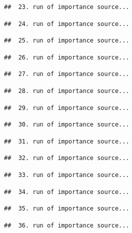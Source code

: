 \documentclass[
]{article}
\begin{document}
\begin{verbatim}
##  23. run of importance source...
\end{verbatim}

\begin{verbatim}
##  24. run of importance source...
\end{verbatim}

\begin{verbatim}
##  25. run of importance source...
\end{verbatim}

\begin{verbatim}
##  26. run of importance source...
\end{verbatim}

\begin{verbatim}
##  27. run of importance source...
\end{verbatim}

\begin{verbatim}
##  28. run of importance source...
\end{verbatim}

\begin{verbatim}
##  29. run of importance source...
\end{verbatim}

\begin{verbatim}
##  30. run of importance source...
\end{verbatim}

\begin{verbatim}
##  31. run of importance source...
\end{verbatim}

\begin{verbatim}
##  32. run of importance source...
\end{verbatim}

\begin{verbatim}
##  33. run of importance source...
\end{verbatim}

\begin{verbatim}
##  34. run of importance source...
\end{verbatim}

\begin{verbatim}
##  35. run of importance source...
\end{verbatim}

\begin{verbatim}
##  36. run of importance source...
\end{verbatim}
\end{document}
